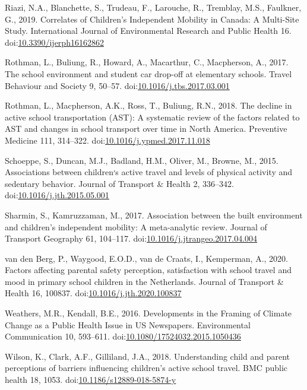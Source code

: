 \documentclass[]{elsarticle} %
\begin{document}
\leavevmode\hypertarget{ref-riaziCorrelatesChildrenIndependent2019}{}%
Riazi, N.A., Blanchette, S., Trudeau, F., Larouche, R., Tremblay, M.S.,
Faulkner, G., 2019. Correlates of Children's Independent Mobility in
Canada: A Multi-Site Study. International Journal of Environmental
Research and Public Health 16.
doi:\href{https://doi.org/10.3390/ijerph16162862}{10.3390/ijerph16162862}

\leavevmode\hypertarget{ref-rothmanSchoolEnvironmentStudent2017}{}%
Rothman, L., Buliung, R., Howard, A., Macarthur, C., Macpherson, A.,
2017. The school environment and student car drop-off at elementary
schools. Travel Behaviour and Society 9, 50--57.
doi:\href{https://doi.org/10.1016/j.tbs.2017.03.001}{10.1016/j.tbs.2017.03.001}

\leavevmode\hypertarget{ref-rothmanDeclineActiveSchool2018a}{}%
Rothman, L., Macpherson, A.K., Ross, T., Buliung, R.N., 2018. The
decline in active school transportation (AST): A systematic review of
the factors related to AST and changes in school transport over time in
North America. Preventive Medicine 111, 314--322.
doi:\href{https://doi.org/10.1016/j.ypmed.2017.11.018}{10.1016/j.ypmed.2017.11.018}

\leavevmode\hypertarget{ref-schoeppeAssociationsChildrenActive2015}{}%
Schoeppe, S., Duncan, M.J., Badland, H.M., Oliver, M., Browne, M., 2015.
Associations between children׳s active travel and levels of physical
activity and sedentary behavior. Journal of Transport \& Health 2,
336--342.
doi:\href{https://doi.org/10.1016/j.jth.2015.05.001}{10.1016/j.jth.2015.05.001}

\leavevmode\hypertarget{ref-sharminAssociationBuiltEnvironment2017}{}%
Sharmin, S., Kamruzzaman, M., 2017. Association between the built
environment and children's independent mobility: A meta-analytic review.
Journal of Transport Geography 61, 104--117.
doi:\href{https://doi.org/10.1016/j.jtrangeo.2017.04.004}{10.1016/j.jtrangeo.2017.04.004}

\leavevmode\hypertarget{ref-vandenbergFactorsAffectingParental2020}{}%
van den Berg, P., Waygood, E.O.D., van de Craats, I., Kemperman, A.,
2020. Factors affecting parental safety perception, satisfaction with
school travel and mood in primary school children in the Netherlands.
Journal of Transport \& Health 16, 100837.
doi:\href{https://doi.org/10.1016/j.jth.2020.100837}{10.1016/j.jth.2020.100837}

\leavevmode\hypertarget{ref-weathersDevelopmentsFramingClimate2016}{}%
Weathers, M.R., Kendall, B.E., 2016. Developments in the Framing of
Climate Change as a Public Health Issue in US Newspapers. Environmental
Communication 10, 593--611.
doi:\href{https://doi.org/10.1080/17524032.2015.1050436}{10.1080/17524032.2015.1050436}

\leavevmode\hypertarget{ref-wilsonUnderstandingChildParent2018}{}%
Wilson, K., Clark, A.F., Gilliland, J.A., 2018. Understanding child and
parent perceptions of barriers influencing children's active school
travel. BMC public health 18, 1053.
doi:\href{https://doi.org/10.1186/s12889-018-5874-y}{10.1186/s12889-018-5874-y}
\end{document}

